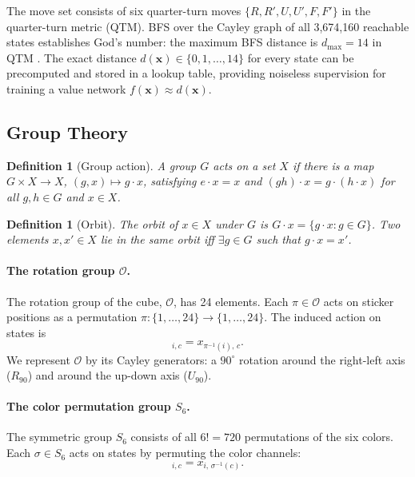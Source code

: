 \documentclass[11pt]{article}
\newtheorem{definition}[theorem]{Definition}
\newcommand{\bx}{\mathbf{x}}
\begin{document}
The move set consists of six quarter-turn moves
$\{R, R', U, U', F, F'\}$ in the quarter-turn metric (QTM).
BFS over the Cayley graph of all 3,674,160 reachable states establishes
God's number: the maximum BFS distance is $d_{\max} = 14$ in QTM
\cite{jaapsch2x2, rokicki2014diameter}.
The exact distance $d(\bx) \in \{0, 1, \ldots, 14\}$ for every state can
be precomputed and stored in a lookup table, providing noiseless supervision
for training a value network $f(\bx) \approx d(\bx)$.

\subsection{Group Theory}

\begin{definition}[Group action]
A group $G$ \emph{acts} on a set $X$ if there is a map
$G \times X \to X$, $(g, x) \mapsto g \cdot x$, satisfying
$e \cdot x = x$ and $(gh) \cdot x = g \cdot (h \cdot x)$ for all
$g, h \in G$ and $x \in X$.
\end{definition}

\begin{definition}[Orbit]
The \emph{orbit} of $x \in X$ under $G$ is
$G \cdot x = \{g \cdot x : g \in G\}$.
Two elements $x, x' \in X$ lie in the same orbit iff $\exists g \in G$
such that $g \cdot x = x'$.
\end{definition}

\paragraph{The rotation group $\mathcal{O}$.}
The rotation group of the cube, $\mathcal{O}$, has 24 elements.
Each $\pi \in \mathcal{O}$ acts on sticker positions as a permutation
$\pi: \{1,\ldots,24\} \to \{1,\ldots,24\}$.
The induced action on states is
\begin{equation}
  [\pi \cdot \bx]_{i,c} = x_{\pi^{-1}(i),\, c}.
  \label{eq:spatial_action}
\end{equation}
We represent $\mathcal{O}$ by its Cayley generators: a $90^\circ$ rotation
around the right-left axis ($R_{90}$) and around the up-down axis ($U_{90}$).

\paragraph{The color permutation group $S_6$.}
The symmetric group $S_6$ consists of all $6! = 720$ permutations of the six
colors.
Each $\sigma \in S_6$ acts on states by permuting the color channels:
\begin{equation}
  [\sigma \cdot \bx]_{i,c} = x_{i,\, \sigma^{-1}(c)}.
  \label{eq:color_action}
\end{equation}
\end{document}
